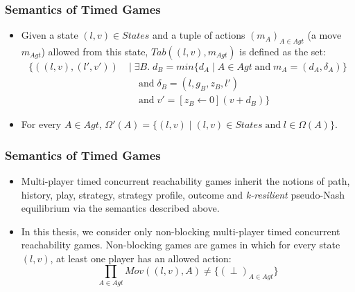 \documentclass{beamer}
\begin{document}
\begin{frame}
\frametitle{Semantics of Timed Games}
  \begin{itemize}
 	\item Given a state $(l, v) \in States$ and a tuple of actions $(m_{A})_{A\in Agt}$ (a move $m_{Agt}$) allowed from this state, $Tab((l, v), m_{Agt})$ is defined as the set:
\begin{align*}
\Big\lbrace ((l, v), (l', v')) \; &\Big\vert \; \exists B. \; d_{B} = min\lbrace d_{A} \; \vert \; A \in Agt \; \text{and} \; m_{A} = (d_{A}, \delta_{A}) \rbrace\\
&\quad \text{and} \; \delta_{B} = (l, g_{B}, z_{B}, l')\\
&\quad \text{and} \; v' = [z_{B} \leftarrow 0](v + d_{B}) \Big\rbrace
\end{align*}
 	\item  For every $A \in Agt$, $\Omega'(A) = \lbrace (l, v) \; \vert \; (l, v) \in States \; \text{and} \; l \in \Omega(A) \rbrace$.
  \end{itemize}
\end{frame}

\begin{frame}
\frametitle{Semantics of Timed Games}
  \begin{itemize}
 	\item Multi-player timed concurrent reachability games inherit the notions of path, history, play, strategy, strategy profile, outcome and \textit{k-resilient} pseudo-Nash equilibrium via the semantics described above.
 	\item  In this thesis, we consider only non-blocking multi-player timed concurrent reachability games. Non-blocking games are games in which for every state $(l, v)$, at least one player has an allowed action:
\[\prod \limits_{A \in Agt} Mov((l, v), A) \neq \lbrace (\perp)_{A\in Agt} \rbrace\]
  \end{itemize}
\end{frame}
\end{document}
